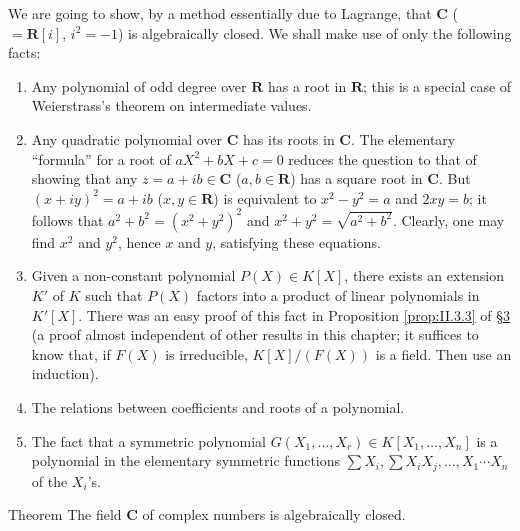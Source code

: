We are going to show, by a method essentially due to Lagrange, that
$\mathbf{C}$ ($=\mathbf{R}[i]$, $i^{2}=-1$) is algebraically closed. We
shall make use of only the following facts:
\begin{enumerate}[label=\arabic*.]
\item\label{fact:II.A.1} Any polynomial of odd degree over $\mathbf{R}$ has a root in
$\mathbf{R}$; this is a special case of Weierstrass's theorem on
intermediate values.
\item\label{fact:II.A.2} Any quadratic polynomial over $\mathbf{C}$ has its roots in
$\mathbf{C}$. The elementary ``formula'' for a root of $aX^{2}+bX+c=0$
reduces the question to that of showing that any $z=a+ib\in\mathbf{C}$
($a,b\in\mathbf{R}$) has a square root in $\mathbf{C}$. But
$(x+iy)^{2}=a+ib$ ($x,y\in\mathbf{R}$) is equivalent to $x^{2}-y^{2}=a$ and
$2xy=b$; it follows that $a^{2}+b^{2}=(x^{2}+y^{2})^{2}$ and
$x^{2}+y^{2}=\sqrt{a^{2}+b^{2}}$. Clearly, one may find $x^{2}$ and $y^{2}$,
hence $x$ and $y$, satisfying these equations.
\item\label{fact:II.A.3} Given a non-constant polynomial $P(X)\in K[X]$, there exists an
extension $K'$ of $K$ such that $P(X)$ factors into a product of linear
polynomials in $K'[X]$. There was an easy proof of this fact in Proposition
\ref{prop:II.3.3} of \hyperref[sec:2.3]{§3} (a proof almost independent of other results in this
chapter; it suffices to know that, if $F(X)$ is irreducible,
$K[X]/(F(X))$ is a field. Then use an induction).
\item\label{fact:II.A.4} The relations between coefficients and roots of a polynomial.
\item\label{fact:II.A.5} The fact that a symmetric polynomial
$G(X_{1},\ldots,X_{r})\in K[X_{1},\ldots,X_{n}]$ is a polynomial in the
elementary symmetric functions
$\sum X_{i},\sum X_{i}X_{j},\ldots,X_{1}\cdots X_{n}$ of the $X_{i}$'s.
\end{enumerate}

\begin{statement}{Theorem}
The field $\mathbf{C}$ of complex numbers is algebraically closed.
\end{statement}

